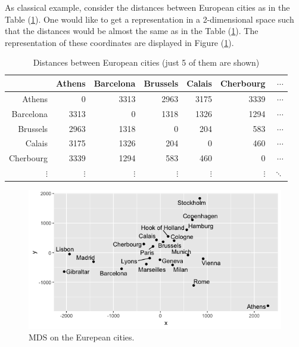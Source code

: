 \documentclass[11pt]{report}
\begin{document}
\indent As classical example, consider the distances between European cities as
in the Table (\ref{european_distances}). One would like to get a representation in
a 2-dimensional space such that the distances would be almost the same as in the 
Table (\ref{european_distances}). The representation of these coordinates are 
displayed in Figure (\ref{europ_cities}).

\begin{table}[ht]
\centering
\begin{tabular}{rrrrrrr}
  \hline
 & Athens & Barcelona & Brussels & Calais & Cherbourg & $\dotsi$ \\ 
  \hline
Athens & 0 & 3313 & 2963 & 3175 & 3339 & $\dotsi$ \\ 
  Barcelona & 3313 & 0& 1318 & 1326 & 1294 & $\dotsi$ \\ 
  Brussels & 2963 & 1318 & 0 & 204 & 583 & $\dotsi$ \\ 
  Calais & 3175 & 1326 & 204 & 0 & 460 & $\dotsi$ \\ 
  Cherbourg & 3339 & 1294 & 583 & 460 & 0 & $\dotsi$ \\
  $\vdots$ & $\vdots$ & $\vdots$ & $\vdots$ & $\vdots$ & $\vdots$ & $\ddots$ \\
   \hline
\end{tabular}
\caption{Distances between European cities (just 5 of them are shown)} 
\label{european_distances}
\end{table}


\begin{figure}[ht]
\centering
    \includegraphics[scale = 0.5]{./images/europ_cities.png}
    \caption{MDS on the Eurepean cities.}
    \label{europ_cities}
\end{figure}

\end{document}
